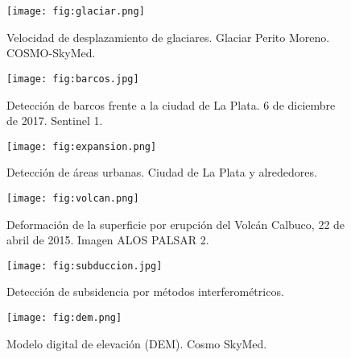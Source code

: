 \begin{frame}{} \vskip0cm
  \begin{figure}
    \centering
    \texttt{[image: fig:glaciar.png]}
    \caption{Velocidad de desplazamiento de glaciares. Glaciar Perito Moreno. COSMO-SkyMed.}
    \label{}
  \end{figure}
\end{frame}

\begin{frame}{} \vskip0cm
  \begin{figure}
    \centering
    \texttt{[image: fig:barcos.jpg]}
    \caption{Detección de barcos frente a la ciudad de La Plata. 6 de diciembre de 2017. Sentinel 1.}
    \label{}
  \end{figure}
\end{frame}

\begin{frame}{} \vskip0cm
  \begin{figure}
    \centering
    \texttt{[image: fig:expansion.png]}
    \caption{Detección de áreas urbanas. Ciudad de La Plata y alrededores.}
    \label{}
  \end{figure}
\end{frame}

\begin{frame}{} \vskip0cm
  \begin{figure}
    \centering
    \texttt{[image: fig:volcan.png]}
    \caption{Deformación de la superficie por erupción del Volcán Calbuco, 22 de abril de 2015. Imagen ALOS PALSAR 2.}
    \label{}
  \end{figure}
\end{frame}

\begin{frame}{} \vskip0cm
  \begin{figure}
    \centering
    \texttt{[image: fig:subduccion.jpg]}
    \caption{Detección de subsidencia por métodos interferométricos.}
    \label{}
  \end{figure}
\end{frame}

\begin{frame}{} \vskip0cm
  \begin{figure}
    \centering
    \texttt{[image: fig:dem.png]}
    \caption{Modelo digital de elevación (DEM). Cosmo SkyMed.}
    \label{}
  \end{figure}
\end{frame}


